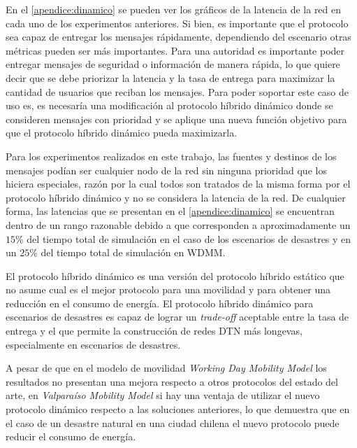 
En el \ref{apendice:dinamico} se pueden ver los gráficos de la latencia de la
red en cada uno de los experimentos anteriores. Si bien, es importante que el
protocolo sea capaz de entregar los mensajes rápidamente, dependiendo del
escenario otras métricas pueden ser más importantes. Para una autoridad es
importante poder entregar mensajes de seguridad o información de manera rápida,
lo que quiere decir que se debe priorizar la latencia y la tasa de entrega para
maximizar la cantidad de usuarios que reciban los mensajes. Para poder soportar
este caso de uso es, es necesaría una modificación al protocolo híbrido dinámico
donde se consideren mensajes con prioridad y se aplique una nueva función
objetivo para que el protocolo híbrido dinámico pueda maximizarla.


Para los experimentos realizados en este trabajo, las fuentes y destinos de los
mensajes podían ser cualquier nodo de la red sin ninguna prioridad que los
hiciera especiales, razón por la cual todos son tratados de la misma forma por
el protocolo híbrido dinámico y no se considera la latencia de la red. De
cualquier forma, las latencias que se presentan en el \ref{apendice:dinamico} se
encuentran dentro de un rango razonable debido a que corresponden a
aproximadamente un $15$\% del tiempo total de simulación en el caso de los
escenarios de desastres y en un $25$\% del tiempo total de simulación en WDMM.







El protocolo híbrido dinámico es una versión del protocolo híbrido estático que
no asume cual es el mejor protocolo para una movilidad y para obtener una
reducción en el consumo de energía. El protocolo híbrido dinámico para
escenarios de desastres es capaz de lograr un \textit{trade-off} aceptable entre
la tasa de entrega y el \overhead{} que permite la construcción de redes DTN más
longevas, especialmente en escenarios de desastres.

A pesar de que en el modelo de movilidad \textit{Working Day Mobility Model}
los resultados no presentan una mejora respecto a otros protocolos del estado
del arte, en \textit{Valparaíso Mobility Model} si hay una ventaja de utilizar
el nuevo protocolo dinámico respecto a las soluciones anteriores, lo que
demuestra que en el caso de un desastre natural en una ciudad chilena el nuevo
protocolo puede reducir el consumo de energía.

